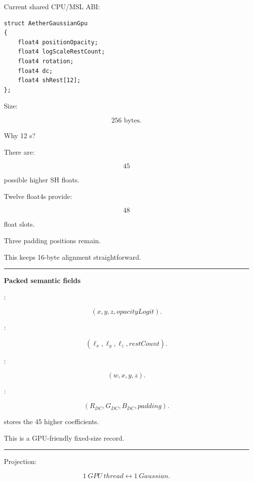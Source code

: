 Current shared CPU/MSL ABI:

\protect{}\label{zxyqtm}%
\begin{verbatim}
struct AetherGaussianGpu
{
    float4 positionOpacity;
    float4 logScaleRestCount;
    float4 rotation;
    float4 dc;
    float4 shRest[12];
};
\end{verbatim}

Size:

\[
\boxed{256\text{ bytes}.}
\]

Why 12 s?

There are:

\[
45
\]

possible higher SH floats.

Twelve float4s provide:

\[
48
\]

float slots.

Three padding positions remain.

This keeps 16-byte alignment straightforward.

\begin{center}\rule{0.5\linewidth}{0.5pt}\end{center}

\textbf{Packed semantic fields}

:

\[
(x,y,z,opacityLogit).
\]

:

\[
(\ell_x,\ell_y,\ell_z,restCount).
\]

:

\[
(w,x,y,z).
\]

:

\[
(R_{DC},G_{DC},B_{DC},padding).
\]

 stores the 45 higher coefficients.

This is a GPU-friendly fixed-size record.

\begin{center}\rule{0.5\linewidth}{0.5pt}\end{center}

Projection:

\[
\boxed{
1\ GPU\ thread
\leftrightarrow
1\ Gaussian.
}
\]

